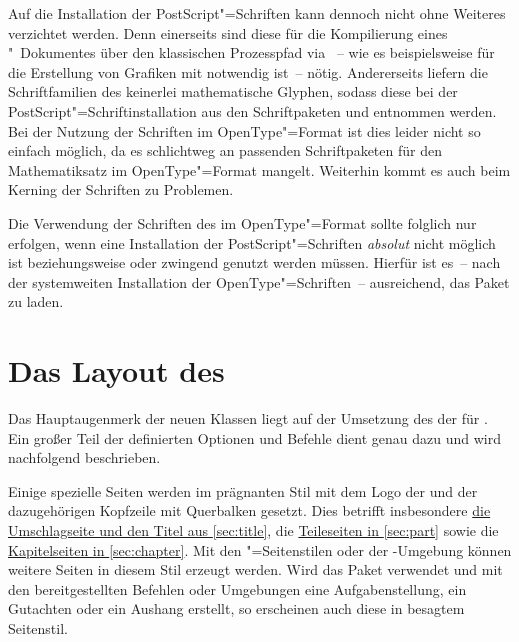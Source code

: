 \begin{Declaration*}{}
\begin{Declaration*}{}
\begin{Declaration*}{}
Auf die Installation der PostScript"=Schriften kann dennoch nicht ohne Weiteres 
verzichtet werden. Denn einerseits sind diese für die Kompilierung eines 
"~Dokumentes über den klassischen Prozesspfad via
~-- wie es 
beispielsweise für die Erstellung von Grafiken mit  notwendig 
ist~-- nötig. Andererseits liefern die Schriftfamilien des \CDs keinerlei 
mathematische Glyphen, sodass diese bei der PostScript"=Schriftinstallation aus 
den Schriftpaketen  und  entnommen werden. Bei 
der Nutzung der Schriften im OpenType"=Format ist dies leider nicht so einfach 
möglich, da es schlichtweg an passenden Schriftpaketen für den Mathematiksatz 
im OpenType"=Format mangelt. Weiterhin kommt es auch beim Kerning der Schriften 
zu Problemen.

Die Verwendung der Schriften des \CDs im OpenType"=Format sollte folglich nur 
erfolgen, wenn eine Installation der PostScript"=Schriften \emph{absolut} nicht 
möglich ist beziehungsweise  oder  zwingend 
genutzt werden müssen. Hierfür ist es~-- nach der systemweiten Installation der 
OpenType"=Schriften~-- ausreichend, das Paket  zu laden.
%



\section{Das Layout des \CDs}
%
%
Das Hauptaugenmerk der neuen Klassen liegt auf der Umsetzung des \CDs der
\TnUD für . Ein großer Teil der definierten Optionen und Befehle
dient genau dazu und wird nachfolgend beschrieben.

Einige spezielle Seiten werden im prägnanten Stil mit dem Logo der \TnUD und 
der dazugehörigen Kopfzeile mit Querbalken gesetzt. Dies betrifft insbesondere 
\hyperref[sec:title]{die Umschlagseite und den Titel aus \autoref{sec:title}}, 
die \hyperref[sec:part]{Teileseiten in \autoref{sec:part}} sowie die
\hyperref[sec:chapter]{Kapitelseiten in \autoref{sec:chapter}}. Mit den 
"=Seitenstilen oder der -Umgebung  
können weitere Seiten in diesem Stil erzeugt werden. Wird das Paket 
 verwendet und mit den bereitgestellten Befehlen oder 
Umgebungen eine Aufgabenstellung, ein Gutachten oder ein Aushang erstellt, so 
erscheinen auch diese in besagtem Seitenstil.



\end{Declaration*}
\end{Declaration*}
\end{Declaration*}
